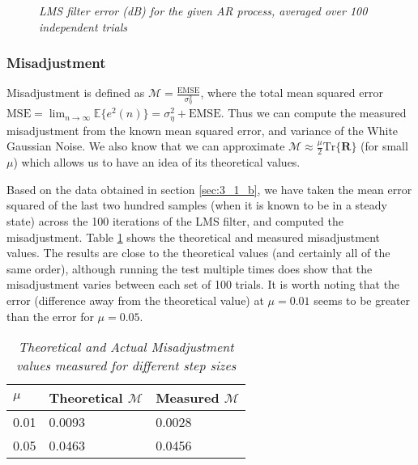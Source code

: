 \documentclass[./main.tex]{subfiles}
\begin{document}
\begin{figure}[h]
	\centering 
 	\resizebox{\textwidth}{!}{}
   	\caption{\textit{LMS filter error (dB) for the given AR process, averaged over 100 independent trials}}
   	\label{fig:q3_1_b}
\end{figure}


\subsubsection{Misadjustment} \label{sec:3_1_c}

Misadjustment is defined as $ \mathcal{M} = \frac{\mathrm{EMSE}}{\sigma^2_\eta}$, where the total mean squared error $ \mathrm{MSE} = \lim_{n \to \infty} \mathbb{E} \{ e^2 (n) \} = \sigma^2_\eta + \mathrm{EMSE} $. Thus we can compute the measured misadjustment from the known mean squared error, and variance of the White Gaussian Noise. We also know that we can approximate $  \mathcal{M} \approx \frac{\mu}{2} \mathrm{Tr} \{ \mathbf{R} \}$ (for small $\mu$) which allows us to have an idea of its theoretical values.

Based on the data obtained in section \ref{sec:3_1_b}, we have taken the mean error squared of the last two hundred samples (when it is known to be in a steady state) across the 100 iterations of the LMS filter, and computed the misadjustment. Table \ref{tab:3_1_c} shows the theoretical and measured misadjustment values. The results are close to the theoretical values (and certainly all of the same order), although running the test multiple times does show that the misadjustment varies between each set of 100 trials. It is worth noting that the error (difference away from the theoretical value) at $ \mu = 0.01 $ seems to be greater than the error for $ \mu = 0.05 $.

\begin{table}[h]
\centering
\begin{tabular}{|l|l|l|}
\hline	
$\mu$  & Theoretical $\mathcal{M}$ & Measured $\mathcal{M}$ \\ \hline
0.01 & 0.0093                    & 0.0028                 \\ \hline
0.05 & 0.0463                    & 0.0456                 \\ \hline
\end{tabular}
\caption{\textit{Theoretical and Actual Misadjustment values measured for different step sizes}}
\label{tab:3_1_c}
\end{table}
\end{document}
